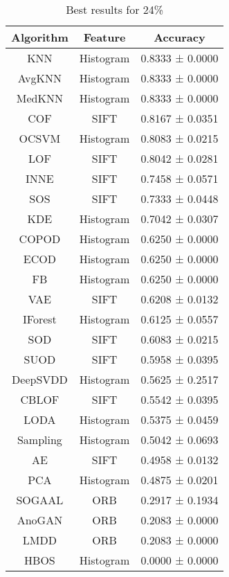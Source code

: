\documentclass{article}
\begin{document}
\begin{table}[]
\centering\begin{tabular}{c|c|c}
\toprule
Algorithm & Feature & Accuracy \\
\midrule
KNN & Histogram & 0.8333 ± 0.0000 \\
AvgKNN & Histogram & 0.8333 ± 0.0000 \\
MedKNN & Histogram & 0.8333 ± 0.0000 \\
COF & SIFT & 0.8167 ± 0.0351 \\
OCSVM & Histogram & 0.8083 ± 0.0215 \\
LOF & SIFT & 0.8042 ± 0.0281 \\
INNE & SIFT & 0.7458 ± 0.0571 \\
SOS & SIFT & 0.7333 ± 0.0448 \\
KDE & Histogram & 0.7042 ± 0.0307 \\
COPOD & Histogram & 0.6250 ± 0.0000 \\
ECOD & Histogram & 0.6250 ± 0.0000 \\
FB & Histogram & 0.6250 ± 0.0000 \\
VAE & SIFT & 0.6208 ± 0.0132 \\
IForest & Histogram & 0.6125 ± 0.0557 \\
SOD & SIFT & 0.6083 ± 0.0215 \\
SUOD & SIFT & 0.5958 ± 0.0395 \\
DeepSVDD & Histogram & 0.5625 ± 0.2517 \\
CBLOF & SIFT & 0.5542 ± 0.0395 \\
LODA & Histogram & 0.5375 ± 0.0459 \\
Sampling & Histogram & 0.5042 ± 0.0693 \\
AE & SIFT & 0.4958 ± 0.0132 \\
PCA & Histogram & 0.4875 ± 0.0201 \\
SOGAAL & ORB & 0.2917 ± 0.1934 \\
AnoGAN & ORB & 0.2083 ± 0.0000 \\
LMDD & ORB & 0.2083 ± 0.0000 \\
HBOS & Histogram & 0.0000 ± 0.0000 \\
\bottomrule
\end{tabular}
\caption{Best results for 24\%}
\label{tab:my_label}
\end{table}
\end{document}
